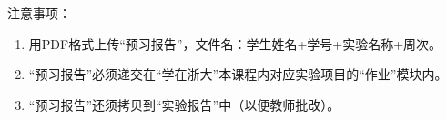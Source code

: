 {\fangsong 注意事项：
\begin{enumerate}[label=\arabic*.]
    \item 用PDF格式上传“预习报告”，文件名：学生姓名+学号+实验名称+周次。
    \item “预习报告”必须递交在“学在浙大”本课程内对应实验项目的“作业”模块内。
    \item “预习报告”还须拷贝到“实验报告”中（以便教师批改）。
\end{enumerate}}
\begin{center}
\end{center}